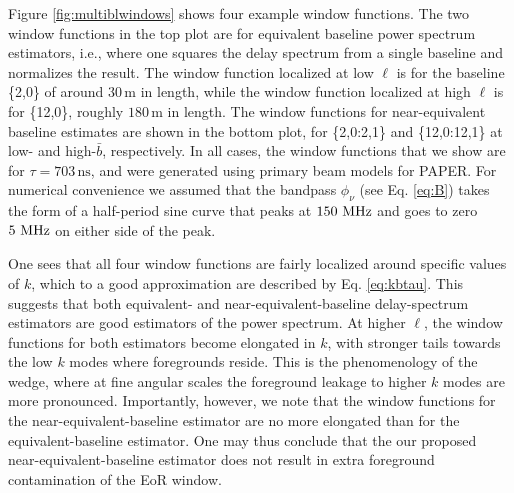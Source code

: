\documentclass[twocolumn,apj,numberedappendix]{emulateapj}
\renewcommand\[{\begin{equation}}
\renewcommand\]{\end{equation}}
\begin{document}
Figure \ref{fig:multiblwindows} shows four example window functions. The two window functions in the top plot are for equivalent baseline power spectrum estimators, i.e., where one squares the delay spectrum from a single baseline and normalizes the result. The window function localized at low $\ell$ is for the baseline \{2,0\} of around $30\,\textrm{m}$ in length, while the window function localized at high $\ell$ is for \{12,0\}, roughly $180\,\textrm{m}$ in length. The window functions for near-equivalent baseline estimates are shown in the bottom plot, for \{2,0:2,1\} and \{12,0:12,1\} at low- and high-$\bar{b}$, respectively. In all cases, the window functions that we show are for $\tau = 703\,\textrm{ns}$, and were generated using primary beam models for PAPER. For numerical convenience we assumed that the bandpass $\phi_\nu$ (see Eq. \eqref{eq:B}) takes the form of a half-period sine curve that peaks at $150\,\textrm{\,MHz}$ and goes to zero $5\,\textrm{\,MHz}$ on either side of the peak.

One sees that all four window functions are fairly localized around specific values of $k$, which to a good approximation are described by Eq. \eqref{eq:kbtau}. This suggests that both equivalent- and near-equivalent-baseline delay-spectrum estimators are good estimators of the power spectrum. At higher $\ell$, the window functions for both estimators become elongated in $k$, with stronger tails towards the low $k$ modes where foregrounds reside. This is the phenomenology of the wedge, where at fine angular scales the foreground leakage to higher $k$ modes are more pronounced. Importantly, however, we note that the window functions for the near-equivalent-baseline estimator are no more elongated than for the equivalent-baseline estimator. One may thus conclude that the our proposed near-equivalent-baseline estimator does not result in extra foreground contamination of the EoR window.

\end{document}
